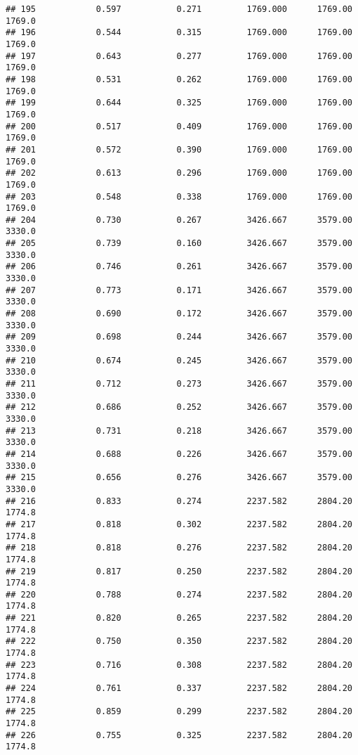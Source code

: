 \documentclass[
]{article}
\begin{document}
\begin{verbatim}
## 195            0.597           0.271         1769.000      1769.00       1769.0
## 196            0.544           0.315         1769.000      1769.00       1769.0
## 197            0.643           0.277         1769.000      1769.00       1769.0
## 198            0.531           0.262         1769.000      1769.00       1769.0
## 199            0.644           0.325         1769.000      1769.00       1769.0
## 200            0.517           0.409         1769.000      1769.00       1769.0
## 201            0.572           0.390         1769.000      1769.00       1769.0
## 202            0.613           0.296         1769.000      1769.00       1769.0
## 203            0.548           0.338         1769.000      1769.00       1769.0
## 204            0.730           0.267         3426.667      3579.00       3330.0
## 205            0.739           0.160         3426.667      3579.00       3330.0
## 206            0.746           0.261         3426.667      3579.00       3330.0
## 207            0.773           0.171         3426.667      3579.00       3330.0
## 208            0.690           0.172         3426.667      3579.00       3330.0
## 209            0.698           0.244         3426.667      3579.00       3330.0
## 210            0.674           0.245         3426.667      3579.00       3330.0
## 211            0.712           0.273         3426.667      3579.00       3330.0
## 212            0.686           0.252         3426.667      3579.00       3330.0
## 213            0.731           0.218         3426.667      3579.00       3330.0
## 214            0.688           0.226         3426.667      3579.00       3330.0
## 215            0.656           0.276         3426.667      3579.00       3330.0
## 216            0.833           0.274         2237.582      2804.20       1774.8
## 217            0.818           0.302         2237.582      2804.20       1774.8
## 218            0.818           0.276         2237.582      2804.20       1774.8
## 219            0.817           0.250         2237.582      2804.20       1774.8
## 220            0.788           0.274         2237.582      2804.20       1774.8
## 221            0.820           0.265         2237.582      2804.20       1774.8
## 222            0.750           0.350         2237.582      2804.20       1774.8
## 223            0.716           0.308         2237.582      2804.20       1774.8
## 224            0.761           0.337         2237.582      2804.20       1774.8
## 225            0.859           0.299         2237.582      2804.20       1774.8
## 226            0.755           0.325         2237.582      2804.20       1774.8

\end{verbatim}
\end{document}
